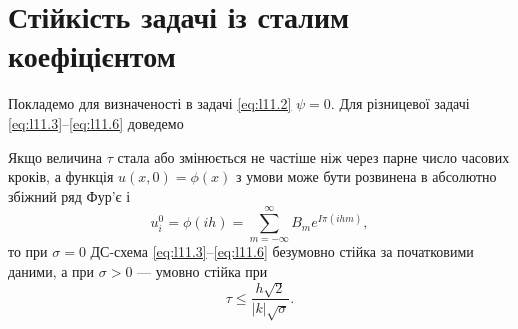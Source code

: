 \section{Стійкість задачі із сталим коефіцієнтом}

Покладемо для визначеності в задачі \eqref{eq:l11.2} $\psi = 0$. Для різницевої задачі \eqref{eq:l11.3}--\eqref{eq:l11.6} доведемо

\begin{theorem}
    Якщо величина $\tau$ стала або змінюється не частіше ніж через парне число часових кроків, а функція $u(x,0)=\phi(x)$ з умови може бути розвинена в абсолютно збіжний ряд Фур'є і \[u_i^0 = \phi(ih) = \sum_{m=-\infty}^\infty B_m e^{I\pi(ihm)},\] то при $\sigma=0$ ДС-схема \eqref{eq:l11.3}--\eqref{eq:l11.6} безумовно стійка за початковими даними, а при $\sigma > 0$  --- умовно стійка при \[\tau \le \frac{h \sqrt{2}}{|k| \sqrt{\sigma}}.\]
\end{theorem}


